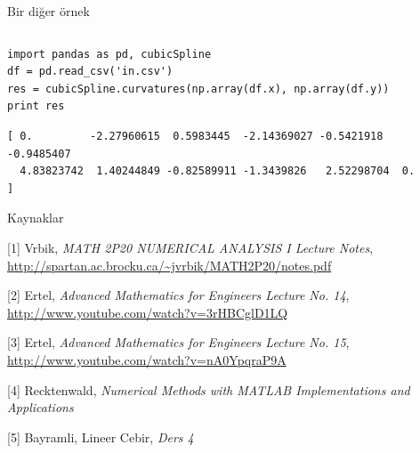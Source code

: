 \documentclass[12pt,fleqn]{article}\usepackage{../../common}
\begin{document}
Bir diğer örnek

\inputminted[fontsize=\footnotesize]{python}{cubicSpline.py}

\begin{verbatim}
import pandas as pd, cubicSpline
df = pd.read_csv('in.csv')
res = cubicSpline.curvatures(np.array(df.x), np.array(df.y))
print res
\end{verbatim}

\begin{verbatim}
[ 0.         -2.27960615  0.5983445  -2.14369027 -0.5421918  -0.9485407
  4.83823742  1.40244849 -0.82589911 -1.3439826   2.52298704  0.        ]
\end{verbatim}

Kaynaklar

[1] Vrbik, {\em MATH 2P20 NUMERICAL ANALYSIS I Lecture Notes}, \url{http://spartan.ac.brocku.ca/~jvrbik/MATH2P20/notes.pdf}

[2] Ertel, {\em Advanced Mathematics for Engineers Lecture No. 14}, \url{http://www.youtube.com/watch?v=3rHBCglD1LQ}

[3] Ertel, {\em Advanced Mathematics for Engineers Lecture No. 15}, \url{http://www.youtube.com/watch?v=nA0YpqraP9A}

[4] Recktenwald, {\em Numerical Methods with MATLAB Implementations and Applications}

[5] Bayramli, Lineer Cebir, {\em Ders 4}
\end{document}
